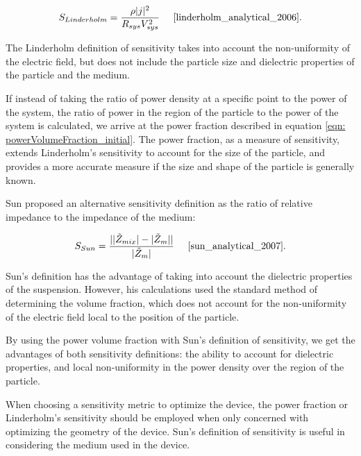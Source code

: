 \begin{equation}
    S_{Linderholm} = \frac{\rho |j|^2}{R_{sys}V_{sys}^2} \;\;\;\;\;\cite{linderholm_analytical_2006}.
    \label{eqn:Linderholtz}
\end{equation}

\noindent The Linderholm definition of sensitivity takes into account the non-uniformity of the electric field, but does not include the particle size and dielectric properties of the particle and the medium.

\par If instead of taking the ratio of power density at a specific point to the power of the system, the ratio of power in the region of the particle to the power of the system is calculated, we arrive at the power fraction described in equation \ref{eqn: powerVolumeFraction_initial}. The power fraction, as a measure of sensitivity, extends Linderholm's sensitivity to account for the size of the particle, and provides a more accurate measure if the size and shape of the particle is generally known.

\par Sun proposed an alternative sensitivity definition as the ratio of relative impedance to the impedance of the medium:

\begin{equation}
    S_{Sun} = \frac{| |\Tilde{Z}_{mix}| - |\Tilde{Z}_m| |}{|\Tilde{Z}_m|} \;\;\;\;\; \cite{sun_analytical_2007}.
\end{equation}

\par Sun's definition has the advantage of taking into account the dielectric properties of the suspension. However, his calculations used the standard method of determining the volume fraction, which does not account for the non-uniformity of the electric field local to the position of the particle. 

\par By using the power volume fraction with Sun's definition of sensitivity, we get the advantages of both sensitivity definitions: the ability to account for dielectric properties, and local non-uniformity in the power density over the region of the particle.

\par When choosing a sensitivity metric to optimize the device, the power fraction or Linderholm's sensitivity should be employed when only concerned with optimizing the geometry of the device. Sun's definition of sensitivity is useful in considering the medium used in the device.



